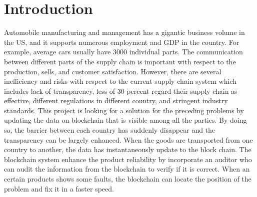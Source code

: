 \documentclass[12pt]{article}
\begin{document}
\section{Introduction}
Automobile manufacturing and management has a gigantic business volume in the US, and it supports numerous employment and GDP in the country. For example, average cars usually have 3000 individual parts. The communication between different parts of the supply chain is important with respect to the production, sells, and customer satisfaction. However, there are several inefficiency and risks with respect to the current supply chain system which includes lack of transparency\cite{choudhurry_2020}, less of 30 percent regard their supply chain as effective, different regulations in different country, and stringent industry standards. This project is looking for a solution for the preceding problems by updating the data on blockchain that is visible among all the parties. By doing so, the barrier between each country has suddenly disappear and the transparency can be largely enhanced. When the goods are transported from one country to another, the data has instantaneously update to the block chain. The blockchain system enhance the product reliability by incorporate an auditor who can audit the information from the blockchain to verify if it is correct. When an certain products shows some faults, the blockchain can locate the position of the problem and fix it in a faster speed.

%
\end{document}
